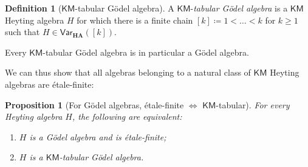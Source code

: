 \documentclass[12pt]{amsart}
\theoremstyle{plain}
\newtheorem{proposition}[theorem]{Proposition}
\theoremstyle{definition}
\newtheorem{definition}[theorem]{Definition}
\newcommand{\KM}{\mathsf{KM}}
\begin{document}
\begin{definition}[$\KM$-tabular Gödel algebra]
     A $\KM$-\emph{tabular Gödel algebra} is a $\KM$ Heyting algebra $H$ for which there is a finite chain $[k]\coloneqq 1<\dots<k$ for $k\geq 1$ such that $H\in \mathsf{Var}_{\mathbf{HA}}([k])$.
\end{definition}
Every $\KM$-tabular Gödel algebra is in particular a G\"odel algebra.

We can thus show that all algebras belonging to a natural class of $\KM$ Heyting algebras are étale-finite:

\begin{proposition}[For G\"odel algebras, étale-finite $\Leftrightarrow$ $\KM$-tabular]
    For every Heyting algebra $H$, the following are equivalent:
    \begin{enumerate}
        \item \label{eq: Gödel + etale-finite} $H$ is a Gödel algebra and is étale-finite;
        \item \label{eq: KM-tabular Godel} $H$ is a $\KM$-tabular Gödel algebra.
    \end{enumerate}
\end{proposition}
\end{document}
